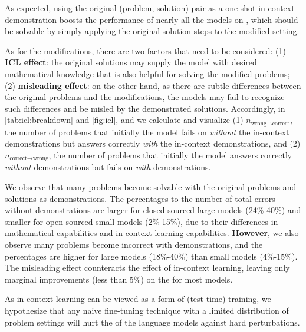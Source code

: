 As expected, using the original (problem, solution) pair as a one-shot in-context demonstration boosts the performance of nearly all the models on \SAME, which should be solvable by simply applying the original solution steps to the modified setting.   

As for the \HARD modifications, there are two factors that need to be considered: (1) \textbf{ICL effect}: the original solutions may supply the model with desired mathematical knowledge that is also helpful for solving the modified problems; (2) \textbf{misleading effect}: on the other hand, as there are subtle differences between the original problems and the \HARD modifications, the models may fail to recognize such differences and be misled by the demonstrated solutions.
Accordingly, in \cref{tab:icl:breakdown} and \cref{fig:icl}, and we calculate and visualize (1) $n_{\text{wrong} \to \text{correct}}$, the number of problems that initially the model fails on \textit{without} the in-context demonstrations but answers correctly \textit{with} the in-context demonstrations, and (2) $n_{\text{correct} \to \text{wrong}}$, the number of problems that initially the model answers correctly \textit{without} demonstrations but fails on \textit{with} demonstrations. 

We observe that many \HARD problems become solvable with the original problems and solutions as demonstrations. The percentages to the number of total errors without demonstrations are larger for closed-sourced large models (24\%-40\%) and smaller for open-sourced small models (2\%-15\%), due to their differences in mathematical capabilities and in-context learning capabilities. \textbf{However}, we also observe many \HARD problems become incorrect with demonstrations, and the percentages are higher for large models (18\%-40\%) than small models (4\%-15\%). 
The misleading effect counteracts the effect of in-context learning, leaving only marginal improvements (less than 5\%) on the \HARD for most models. 


As in-context learning can be viewed as a form of (test-time) training, we hypothesize that any naive fine-tuning technique with a limited distribution of problem settings will hurt the  of the language models against hard perturbations. %









 





